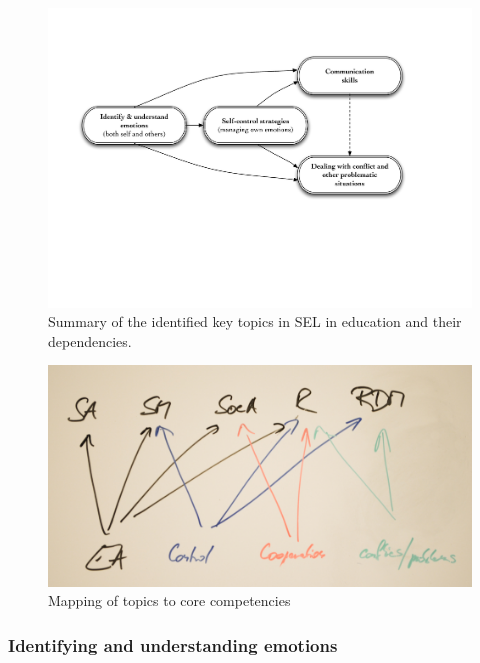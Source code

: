 \documentclass[prodmode,acmtochi]{acmsmall}
\newcommand{\GeraldineFIX}[1]{}
\begin{document}
 
\begin{figure}
  \centering
        \includegraphics[width=\columnwidth]{images/BuildingBlocks.pdf}
        \caption{Summary of the identified key topics in SEL in education and their dependencies.\GeraldineFIX{G: make clearer that this represents your summary of key topics and dependencied}}
        \label{fig:depfoc}
\end{figure}

\begin{figure}
  \centering
        \includegraphics[width=0.9\columnwidth]{images/strategiesMapping}
        \caption{Mapping of topics to core competencies}
        \label{fig:strmap}
\end{figure}


\subsubsection{Identifying and understanding emotions} 
\end{document}
